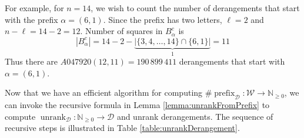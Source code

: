\begin{example}
  For example, for $n = 14$, we wish to count the number of derangements that
  start with the prefix $\alpha = (6,1)$.
  Since the prefix has two letters, $\ell = 2$ and $n - \ell = 14 - 2 = 12$.
  Number of squares in $B_\alpha^c$ is \[
    |B_\alpha^c| = 14 - 2 - \underbrace{|\{3,4,\dots,14\} \cap \{6, 1\}|}_1 = 11
  \]
  Thus there are $A047920(12,11) = 190\,899\,411$ derangements that start
  with $\alpha = (6,1)$.
\end{example}

Now that we have an efficient algorithm for computing
$\#\operatorname{prefix}_\mathcal{D} \colon \mathcal{W} \rightarrow \mathbb{N}_{\geq 0}$,
we can invoke the recursive formula in Lemma \ref{lemma:unrankFromPrefix} to
compute
$\operatorname{unrank}_\mathcal{D} \colon \mathbb{N}_{\geq 0} \rightarrow \mathcal{D}$
and unrank derangements.
The sequence of recursive steps is illustrated in
Table \ref{table:unrankDerangement}.
